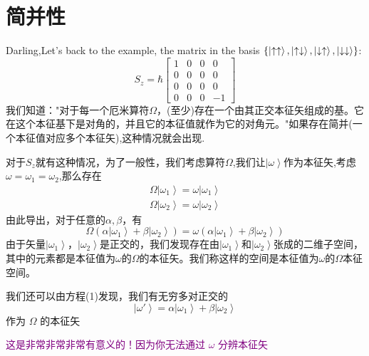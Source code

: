 \section{简并性}
Darling,Let's back to the example, the  matrix in the basis $\{\ket{ \uparrow \uparrow }, \ket{\uparrow \downarrow}, \ket{\downarrow \uparrow}, \ket{\downarrow \downarrow}\}$:
\begin{equation}
	{S_z} = \hbar \left[ {\begin{array}{*{20}{c}}
			1&0&0&0\\
			0&0&0&0\\
			0&0&0&0\\
			0&0&0&{ - 1}
	\end{array}} \right]
\end{equation}
我们知道："对于每一个厄米算符$\Omega$，(至少)存在一个由其正交本征矢组成的基。它在这个本征基下是对角的，并且它的本征值就作为它的对角元。"如果存在简并(一个本征值对应多个本征矢),这种情况就会出现. \par 对于${S_z}$就有这种情况，为了一般性，我们考虑算符$\Omega$,我们让$\left| {{\omega }} \right\rangle $作为本征矢,考虑\newline
$\omega = {\omega _1} = {\omega _2}$,那么存在
\begin{equation}
	\begin{array}{l}
		\Omega \left| {{\omega _1}} \right\rangle  = \omega \left| {{\omega _1}} \right\rangle \\
		\Omega \left| {{\omega _2}} \right\rangle  = \omega \left| {{\omega _2}} \right\rangle 
	\end{array}
\end{equation}
由此导出，对于任意的$\alpha ,\beta $，有
\begin{equation}
	\Omega \left( {\alpha \left| {{\omega _1}} \right\rangle  + \beta \left| {{\omega _2}} \right\rangle } \right) 
	= \omega \left( {\alpha \left| {{\omega _1}} \right\rangle  + \beta \left| {{\omega _2}} \right\rangle } \right)
\end{equation}
由于矢量$\left| {{\omega _1}} \right\rangle $，$\left| {{\omega _2}} \right\rangle $是正交的，我们发现存在由$\left| {{\omega _1}} \right\rangle $和$\left| {{\omega _2}} \right\rangle $张成的二维子空间，其中的元素都是本征值为$\omega $的$\Omega $的本征矢。我们称这样的空间是本征值为$\omega $的$\Omega $本征空间。\par
我们还可以由方程(1)发现，我们有无穷多对正交的
\begin{equation}
	\left| {\omega '} \right\rangle  = \alpha \left| {{\omega _1}} \right\rangle  + \beta \left| {{\omega _2}} \right\rangle
\end{equation}
作为 $\Omega $ 的本征矢\par
\textcolor{purple}{这是非常非常非常有意义的！因为你无法通过 $\omega $ 分辨本征矢}
